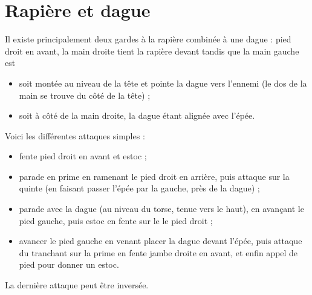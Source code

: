 \chapter{Rapière et dague}


Il existe principalement deux gardes à la rapière combinée à une dague : pied droit en avant, la main droite tient la rapière devant tandis que la main gauche est
\begin{itemize}
	\item soit montée au niveau de la tête et pointe la dague vers l'ennemi (le dos de la main se trouve du côté de la tête) ;
	\item soit à côté de la main droite, la dague étant alignée avec l'épée.
\end{itemize}

\noindent
Voici les différentes attaques simples :
\begin{itemize}
	\item fente pied droit en avant et estoc ;
	\item parade en prime en ramenant le pied droit en arrière, puis attaque sur la quinte (en faisant passer l'épée par la gauche, près de la dague) ;
	\item parade avec la dague (au niveau du torse, tenue vers le haut), en avançant le pied gauche, puis estoc en fente sur le le pied droit ;
	\item avancer le pied gauche en venant placer la dague devant l'épée, puis attaque du tranchant sur la prime
	en fente jambe droite en avant, et enfin appel de pied pour donner un estoc.
\end{itemize}
La dernière attaque peut être inversée.
